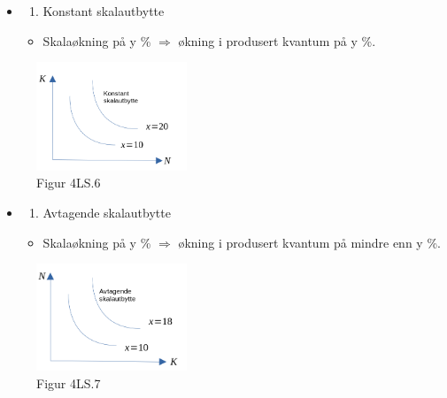 \documentclass[
  letterpaper,
  DIV=11,
  numbers=noendperiod]{scrartcl}
\providecommand{\tightlist}{%
  \setlength{\itemsep}{0pt}\setlength{\parskip}{0pt}}\usepackage{longtable,booktabs,array}
\begin{document}
\begin{itemize}
\item
  \begin{enumerate}
  \def\labelenumi{\roman{enumi})}
  \tightlist
  \item
    Konstant skalautbytte
  \end{enumerate}

  \begin{itemize}
  \tightlist
  \item
    Skalaøkning på y \% \(\Rightarrow\) økning i produsert kvantum på y
    \%.
  \end{itemize}
\end{itemize}

\begin{figure}[H]

{\centering \includegraphics[width=0.4\textwidth,height=\textheight]{drawio/koskala.png}

}

\caption{Figur 4LS.6}

\end{figure}%

\begin{itemize}
\item
  \begin{enumerate}
  \def\labelenumi{\roman{enumi})}
  \setcounter{enumi}{1}
  \tightlist
  \item
    Avtagende skalautbytte
  \end{enumerate}

  \begin{itemize}
  \tightlist
  \item
    Skalaøkning på y \% \(\Rightarrow\) økning i produsert kvantum på
    mindre enn y \%.
  \end{itemize}
\end{itemize}

\begin{figure}[H]

{\centering \includegraphics[width=0.4\textwidth,height=\textheight]{drawio/avskala.png}

}

\caption{Figur 4LS.7}

\end{figure}%
\end{document}
